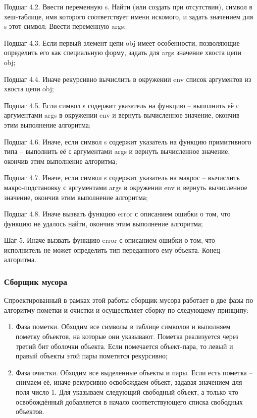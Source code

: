 Подшаг 4.2. Ввести переменную s. Найти (или создать при отсутствии), символ в хеш-таблице, имя которого соответствует имени искомого, и задать значением для s этот символ; Ввести переменную args;

Подшаг 4.3. Если первый элемент цепи obj имеет особенности, позволяющие определить его как специальную форму, задать для args значение хвоста цепи obj;

Подшаг 4.4. Иначе рекурсивно вычислить в окружении env список аргументов из хвоста цепи obj;

Подшаг 4.5. Если символ s содержит указатель на функцию -- выполнить её с аргументами args в окружении env и вернуть вычисленное значение, окончив этим выполнение алгоритма;

Подшаг 4.6. Иначе, если символ s содержит указатель на функцию примитивного типа -- выполнить её с аргументами args и вернуть вычисленное значение, окончив этим выполнение алгоритма;

Подшаг 4.7. Иначе, если символ s содержит указатель на макрос -- вычислить макро-подстановку с аргументами args в окружении env и вернуть вычисленное значение, окончив этим выполнение алгоритма;

Подшаг 4.8. Иначе вызвать функцию error с описанием ошибки о том, что функцию не удалось найти, окончив этим выполнение алгоритма;

Шаг 5. Иначе вызвать функцию error с описанием ошибки о том, что исполнитель не может определить тип переданного ему объекта. Конец алгоритма.

\subsubsection{Сборщик мусора}
Спроектированный в рамках этой работы сборщик мусора работает в две фазы по алгоритму пометки и очистки и осуществляет сборку по следующему принципу:

\begin{enumerate}
	\item Фаза пометки.
	Обходим все символы в таблице символов и выполняем пометку объектов, на которые они указывают. Пометка реализуется через третий бит оболочки объекта. Если помечается объект-пара, то левый и правый объекты этой пары пометятся рекурсивно;
	
	\item Фаза очистки.
	Обходим все выделенные объекты и пары. Если есть пометка -- снимаем её, иначе рекурсивно освобождаем объект, задавая значением для поля  число 1. Для  указываем следующий свободный объект, а только что освобождённый добавляется в начало соответствующего списка свободных объектов.
	
\end{enumerate}

